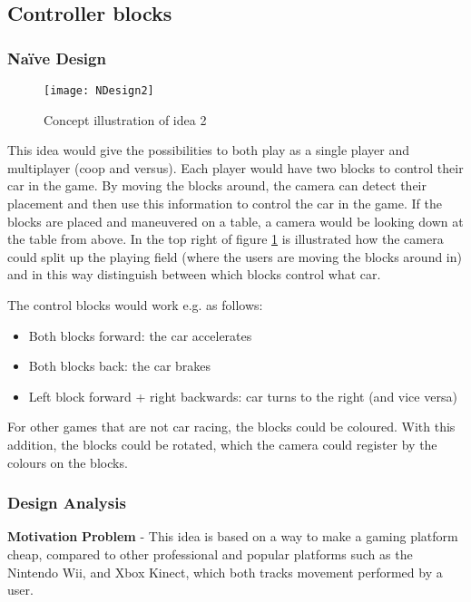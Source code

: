 \pagebreak

\subsection{Controller blocks} \label{nd2}
\subsubsection*{Naïve Design}

\begin{figure}[h]
\centering
\texttt{[image: NDesign2]}
\caption{Concept illustration of idea 2}
\label{fig:ndesign2}
\end{figure}
This idea would give the possibilities to both play as a single player and multiplayer (coop and versus). Each player would have two blocks to control their car in the game. By moving the blocks around, the camera can detect their placement and then use this information to control the car in the game. If the blocks are placed and maneuvered on a table, a camera would be looking down at the table from above. In the top right of figure \ref{fig:ndesign2} is illustrated how the camera could split up the playing field (where the users are moving the blocks around in) and in this way distinguish between which blocks control what car.

The control blocks would work e.g. as follows:
\begin{itemize}
\item Both blocks forward: the car accelerates
\item Both blocks back: the car brakes
\item Left block forward + right backwards: car turns to the right (and vice versa)
\end{itemize}
For other games that are not car racing, the blocks could be coloured. With this addition, the blocks could be rotated, which the camera could register by the colours on the blocks.

\subsubsection*{Design Analysis}
\noindent\textbf{Motivation} \newline
\noindent\textbf{Problem} - This idea is based on a way to make a gaming platform cheap, compared to other professional and popular platforms such as the Nintendo Wii, and Xbox Kinect, which both tracks movement performed by a user.
\bigskip

